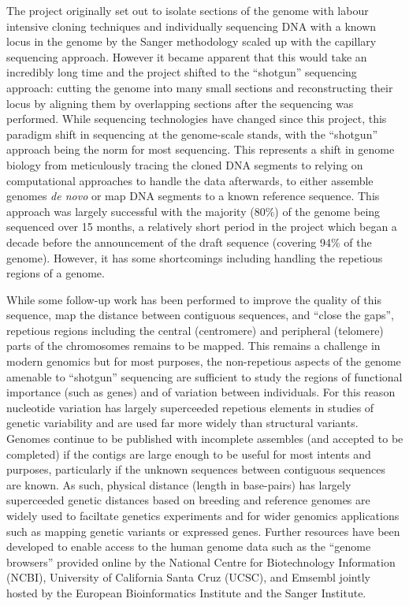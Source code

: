 The project originally set out to isolate sections of the genome with labour intensive cloning techniques and individually sequencing DNA with a known locus in the genome by the Sanger methodology scaled up with the capillary sequencing approach. However it became apparent that this would take an incredibly long time and the project shifted to the ``shotgun'' sequencing approach: cutting the genome into many small sections and reconstructing their locus by aligning them by overlapping sections after the sequencing was performed. While sequencing technologies have changed since this project, this paradigm shift in sequencing at the genome-scale stands, with the ``shotgun'' approach being the norm for most sequencing. This represents a shift in genome biology from meticulously tracing the cloned DNA segments to relying on computational approaches to handle the data afterwards, to either assemble genomes \textit{de novo} or map DNA segments to a known reference sequence. This approach was largely successful with the majority (80\%) of the genome being sequenced over 15 months, a relatively short period in the project which began a decade before the announcement of the draft sequence (covering 94\% of the genome). However, it has some shortcomings including handling the repetious regions of a genome.

While some follow-up work has been performed to improve the quality of this sequence, map the distance between contiguous sequences, and ``close the gaps'', repetious regions including the central (centromere) and peripheral (telomere) parts of the chromosomes remains to be mapped. This remains a challenge in modern genomics but for most purposes, the non-repetious aspects of the genome amenable to ``shotgun'' sequencing are sufficient to study the regions of functional importance (such as genes) and of variation between individuals. For this reason nucleotide variation has largely superceeded repetious elements in studies of genetic variability and are used far more widely than structural variants. Genomes continue to be published with incomplete assembles (and accepted to be completed) if the contigs are large enough to be useful for most intents and purposes, particularly if the unknown sequences between contiguous sequences are known. As such, physical distance (length in base-pairs) has largely superceeded genetic distances based on breeding and reference genomes are widely used to faciltate genetics experiments and for wider genomics applications such as mapping genetic variants or expressed genes. Further resources have been developed to enable access to the human genome data such as the ``genome browsers'' provided online by the National Centre for Biotechnology Information (NCBI), University of California Santa Cruz (UCSC), and Emsembl jointly hosted by the European Bioinformatics Institute and the Sanger Institute. 

